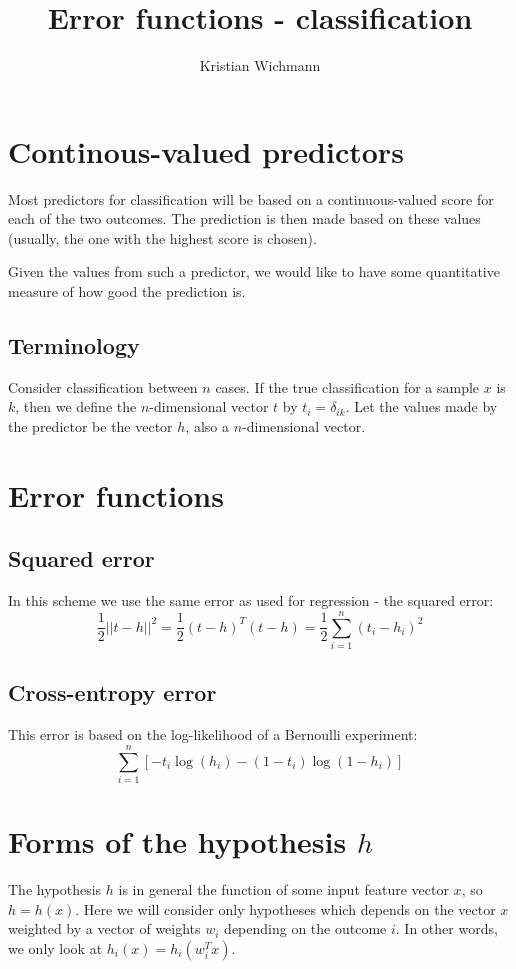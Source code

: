 \documentclass[12pt, a4paper]{article}
\title{Error functions - classification}
\author{Kristian Wichmann}
\numberwithin{equation}{section}
\begin{document}
\maketitle

\section{Continous-valued predictors}
Most predictors for classification will be based on a continuous-valued score for each of the two outcomes. The prediction is then made based on these values (usually, the one with the highest score is chosen).

Given the values from such a predictor, we would like to have some quantitative measure of how good the prediction is.

\subsection{Terminology}
Consider classification between $n$ cases. If the true classification for a sample $x$ is $k$, then we define the $n$-dimensional vector $t$ by $t_i=\delta_{ik}$. Let the values made by the predictor be the vector $h$, also a $n$-dimensional vector.

\section{Error functions}

\subsection{Squared error}
In this scheme we use the same error as used for regression - the squared error:
\begin{equation}
\label{error_squared}
\frac{1}{2}||t-h||^2=\frac{1}{2}(t-h)^T(t-h)=\frac{1}{2}\sum_{i=1}^n(t_i-h_i)^2
\end{equation}

\subsection{Cross-entropy error}
This error is based on the log-likelihood of a Bernoulli experiment:
\begin{equation}
\label{error_crossentropy}
\sum_{i=1}^n\left[-t_i\log(h_i)-(1-t_i)\log(1-h_i)\right]
\end{equation}

\section{Forms of the hypothesis $h$}
The hypothesis $h$ is in general the function of some input feature vector $x$, so $h=h(x)$. Here we will consider only hypotheses which depends on the vector $x$ weighted by a vector of weights $w_i$ depending on the outcome $i$. In other words, we only look at $h_i(x)=h_i(w_i^T x)$.
\end{document}
